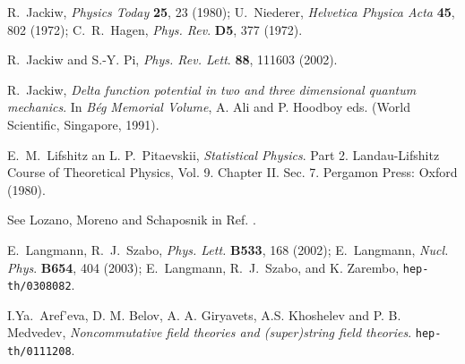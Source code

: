 \documentclass[a4paper,11pt]{article}
\begin{document}
\begin{thebibliography}{99}
R.~Jackiw, {\sl Physics Today} {\bf 25}, 23 (1980);
U.~Niederer, {\sl Helvetica Physica Acta} {\bf 45}, 802 (1972);
C.~R.~Hagen, {\sl Phys. Rev}. {\bf D5}, 377 (1972).

R.~Jackiw and S.-Y. Pi,
{\sl Phys. Rev. Lett}. {\bf 88}, 111603 (2002).

R.~Jackiw,
{\it Delta function potential in two and three dimensional
quantum mechanics}. In {\it B\'eg Memorial Volume},
A. Ali and P. Hoodboy eds. (World Scientific, Singapore, 1991).

E.~M.~Lifshitz an L. P.~Pitaevskii,
{\it Statistical Physics}. Part 2. %
  Landau-Lifshitz Course of Theoretical Physics,
Vol. 9. Chapter II. Sec. 7. Pergamon Press: Oxford (1980).

See Lozano, Moreno and Schaposnik in
Ref. \cite{Baketal}.

  E.~Langmann, R.~J.~Szabo,
{\sl Phys. Lett.} {\bf B533}, 168 (2002);
  E.~Langmann, {\sl Nucl. Phys}. {\bf B654}, 404 (2003);
E.~Langmann, R.~J.~Szabo, and K. Zarembo,
\texttt{hep-th/0308082}.

I.Ya.~Aref'eva, D. M. Belov, A. A. Giryavets,
A.S. Khoshelev and P. B. Medvedev,
{\it Noncommutative field theories and (super)string
field theories}. \texttt{hep-th/0111208}.

\end{thebibliography}
\end{document}
